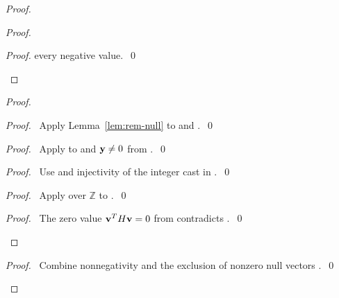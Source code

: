 \begin{proof}
\begin{proof}
\begin{proof}
every negative value.~\qed\end{proof}
\end{proof}
\begin{proof}
\begin{proof}\pf\ Apply Lemma~\ref{lem:rem-null} to 
and .~\qed\end{proof}
\begin{proof}\pf\ Apply 
to  and ${\mathbf y}\ne0$ from .~\qed\end{proof}
\begin{proof}\pf\ Use  and injectivity of the
integer cast in .~\qed\end{proof}
\begin{proof}\pf\ Apply 
over $\mathbb Z$ to .~\qed\end{proof}
\qedstep
\begin{proof}\pf\ The zero value ${\mathbf v}^TH{\mathbf v}=0$ from 
contradicts .~\qed\end{proof}
\end{proof}
\qedstep
\begin{proof}\pf\ Combine nonnegativity  and
the exclusion of nonzero null vectors .~\qed\end{proof}
\end{proof}

